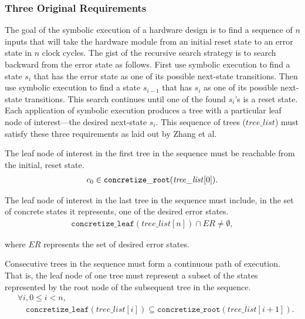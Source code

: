 \subsubsection{Three Original Requirements} The goal of the symbolic execution
of a hardware design is to find a sequence of $n$ inputs that will take the hardware
module from an initial reset state to an error state in $n$ clock cycles. The
gist of the recursive search strategy is to search backward from the error
state as follows. First use symbolic execution to find a state $s_i$ that has the error
state as one of its possible next-state transitions. Then use symbolic execution
to find a state $s_{i-1}$ that has $s_i$ as one of its possible next-state
transitions. This search continues until one of the found $s_i$'s is a reset
state. Each application of symbolic execution produces a tree with a particular
leaf node of interest---the desired next-state $s_i$. This sequence of trees ($\mathit{tree\_list}$)
must satisfy these three requirements as laid out by Zhang et al.
\setcounter{property}{0}
\renewcommand{\theproperty}{Z.\arabic{property}}
\begin{property}
  \label{prop:startinit} The leaf node of interest in the first tree in the
  sequence must be reachable from the initial, reset state.
  \begin{align*}
    c_0 \in \mathtt{concretize\_root}(\mathit{tree\_list}[0]).
  \end{align*}
\end{property}

\begin{property}
  \label{prop:enderror} The leaf node of interest in the last tree in the
  sequence must include, in the set of concrete states it represents, one of the
  desired error states. 
  \begin{align*}
    \mathtt{concretize\_leaf}(\mathit{tree\_list}[n]) \cap \mathit{ER} \neq
    \emptyset,
  \end{align*}
\end{property}
where $\mathit{ER}$ represents the set of desired error states.

\begin{property}
  \label{prop:stitch}
  Consecutive trees in the sequence must form a continuous path of
  execution. That is, the leaf node of one tree must represent a subset of the
  states represented by the root node of the subsequent tree in the sequence.
  \begin{align*}
    &\forall i, 0 \le i < n,\\
    &\quad\mathtt{concretize\_leaf}(\mathit{tree\_list}[i]) \subseteq
\mathtt{concretize\_root}(\mathit{tree\_list}[i+1]).
\end{align*}

\end{property}

